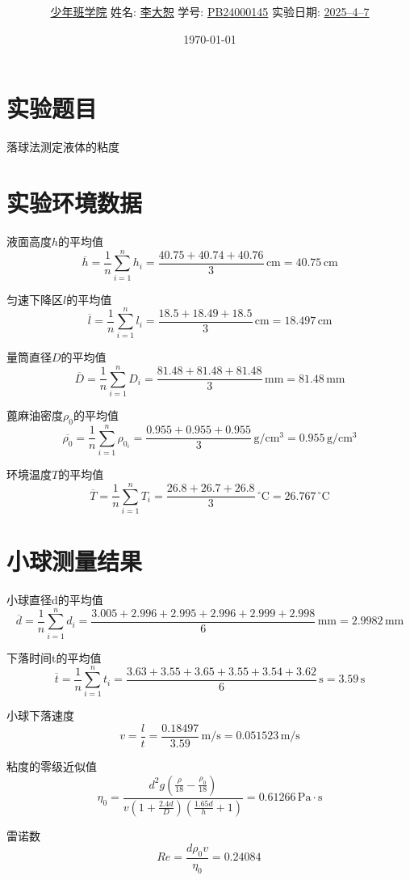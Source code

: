 \documentclass[12pt,a4paper]{article}
\title{\Huge{\textbf{\uuline{数\ 据\ 处\ 理}}}}
\author{\uline{少年班学院} \quad 姓名: \uline{李大恕} \quad 学号: \uline{PB24000145} \quad 实验日期: \uline{2025--4--7}}
\date{\today}
\begin{document}
\maketitle

\section{实验题目}
    落球法测定液体的粘度

\section{实验环境数据}
    液面高度$h$的平均值
    \[
    \overline{h}=\frac{1}{n}\sum_{i=1}^{n}h_i=\frac{40.75+40.74+40.76}{3}\,\mathrm{cm}=40.75\,\mathrm{cm}
    \]

    匀速下降区$l$的平均值
    \[
    \overline{l}=\frac{1}{n}\sum_{i=1}^{n}l_i=\frac{18.5+18.49+18.5}{3}\,\mathrm{cm}=18.497\,\mathrm{cm}
    \]

    量筒直径$D$的平均值
    \[
    \overline{D}=\frac{1}{n}\sum_{i=1}^{n}D_i=\frac{81.48+81.48+81.48}{3}\,\mathrm{mm}=81.48\,\mathrm{mm}
    \]

    蓖麻油密度$\rho_0$的平均值
    \[
    \overline{\rho_0}=\frac{1}{n}\sum_{i=1}^{n}\rho_{0_i}=\frac{0.955+0.955+0.955}{3}\,\mathrm{g/cm^3}=0.955\,\mathrm{g/cm^3}
    \]

    环境温度$T$的平均值
    \[
    \overline{T}=\frac{1}{n}\sum_{i=1}^{n}T_i=\frac{26.8+26.7+26.8}{3}\,\mathrm{^\circ C}=26.767\,\mathrm{^\circ C}
    \]

\section{小球测量结果}
    小球直径d的平均值
    \[
    \overline{d}=\frac{1}{n}\sum_{i=1}^{n}d_i=\frac{3.005+2.996+2.995+2.996+2.999+2.998}{6}\,\mathrm{mm}=2.9982\,\mathrm{mm}
    \]

    下落时间t的平均值
    \[
    \overline{t}=\frac{1}{n}\sum_{i=1}^{n}t_i=\frac{3.63+3.55+3.65+3.55+3.54+3.62}{6}\,\mathrm{s}=3.59\,\mathrm{s}
    \]

    小球下落速度
    \[
    v=\frac{l}{t}=\frac{0.18497}{3.59}\,\mathrm{m/s}=0.051523\,\mathrm{m/s}
    \]

    粘度的零级近似值
    \[
    \eta_{0}=\frac{d^{2} g \left(\frac{\rho}{18} - \frac{\rho_{0}}{18}\right)}{v \left(1 + \frac{2.4 d}{D}\right) \left(\frac{1.65 d}{h} + 1\right)}=0.61266\,\mathrm{Pa·s}
    \]

    雷诺数
    \[
    Re=\frac{d \rho_{0} v}{\eta_{0}}=0.24084\,\mathrm{}
    \]
\end{document}
